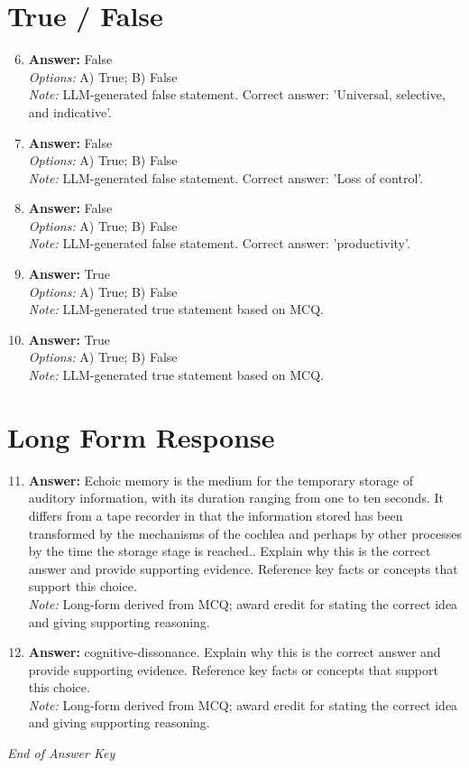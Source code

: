 \documentclass[12pt]{article}
\begin{document}
\section*{True / False}
\begin{enumerate}[label=\arabic*.]
\setcounter{enumi}{5}
\item \textbf{Answer:} False
\\ \textit{Options:} A) True; B) False
\\ \textit{Note:} LLM-generated false statement. Correct answer: 'Universal, selective, and indicative'.
\item \textbf{Answer:} False
\\ \textit{Options:} A) True; B) False
\\ \textit{Note:} LLM-generated false statement. Correct answer: 'Loss of control'.
\item \textbf{Answer:} False
\\ \textit{Options:} A) True; B) False
\\ \textit{Note:} LLM-generated false statement. Correct answer: 'productivity'.
\item \textbf{Answer:} True
\\ \textit{Options:} A) True; B) False
\\ \textit{Note:} LLM-generated true statement based on MCQ.
\item \textbf{Answer:} True
\\ \textit{Options:} A) True; B) False
\\ \textit{Note:} LLM-generated true statement based on MCQ.
\end{enumerate}

\section*{Long Form Response}
\begin{enumerate}[label=\arabic*.]
\setcounter{enumi}{10}
\item \textbf{Answer:} Echoic memory is the medium for the temporary storage of auditory information, with its duration ranging from one to ten seconds. It differs from a tape recorder in that the information stored has been transformed by the mechanisms of the cochlea and perhaps by other processes by the time the storage stage is reached.. Explain why this is the correct answer and provide supporting evidence. Reference key facts or concepts that support this choice.
\\ \textit{Note:} Long-form derived from MCQ; award credit for stating the correct idea and giving supporting reasoning.
\item \textbf{Answer:} cognitive-dissonance. Explain why this is the correct answer and provide supporting evidence. Reference key facts or concepts that support this choice.
\\ \textit{Note:} Long-form derived from MCQ; award credit for stating the correct idea and giving supporting reasoning.
\end{enumerate}

\vfill
\noindent\textit{End of Answer Key}
\end{document}
